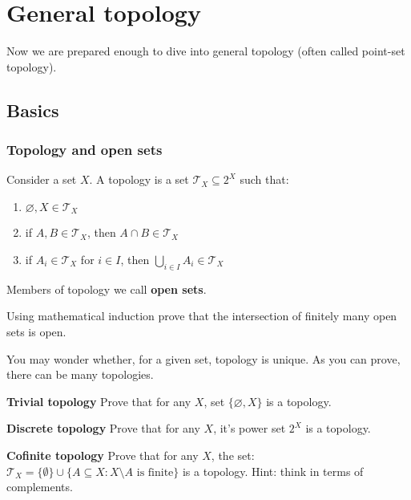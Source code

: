 
\newcommand{\Int}{\text{Int\,}}

\chapter{General topology}
\label{general_topology}
Now we are prepared enough to dive into general topology (often called point-set topology).

\section{Basics}
\subsection{Topology and open sets}
Consider a set $X$. A topology is a set $\mathcal{T}_X \subseteq 2^X $ such that:
\begin{enumerate}
	\item $\varnothing, X\in \mathcal{T}_X$
	\item if $A, B\in \mathcal{T}_X$, then $A\cap B\in \mathcal{T}_X$
	\item if $A_i\in \mathcal{T}_X$ for $i\in I$, then $\bigcup_{i\in I} A_i\in \mathcal T_X$
\end{enumerate}
Members of topology we call \textbf{open sets}.

\begin{prob}
	Using mathematical induction prove that the intersection of finitely many open sets is open.
\end{prob}

You may wonder whether, for a given set, topology is unique. As you can prove, there can be many topologies.

\begin{prob}
	\textbf{Trivial topology} Prove that for any $X$, set $\{\varnothing, X\}$ is a topology.
\end{prob}

\begin{prob}
	\textbf{Discrete topology} Prove that for any $X$, it's power set $2^X$ is a topology.
\end{prob}

\begin{prob}
	\textbf{Cofinite topology} Prove that for any $X$, the set:
  $\mathcal T_X=\{\emptyset\}\cup \{A\subseteq X : X\setminus A \text{ is finite}\}$ is a topology. Hint: think in terms of complements.
\end{prob}

